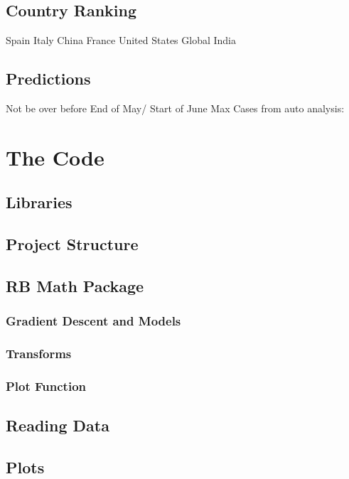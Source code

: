 \documentclass{report}
\begin{document}
        \subsection{Country Ranking}
            Spain Italy China France United States Global India
        \subsection{Predictions}
            Not be over before End of May/ Start of June
            \newline
            Max Cases from auto analysis:
    \section{The Code}
        \subsection{Libraries}
        \subsection{Project Structure}
        \subsection{RB Math Package}
            \subsubsection{Gradient Descent and Models}
            \subsubsection{Transforms}
            \subsubsection{Plot Function}
        \subsection{Reading Data}
        \subsection{Plots}
\end{document}

